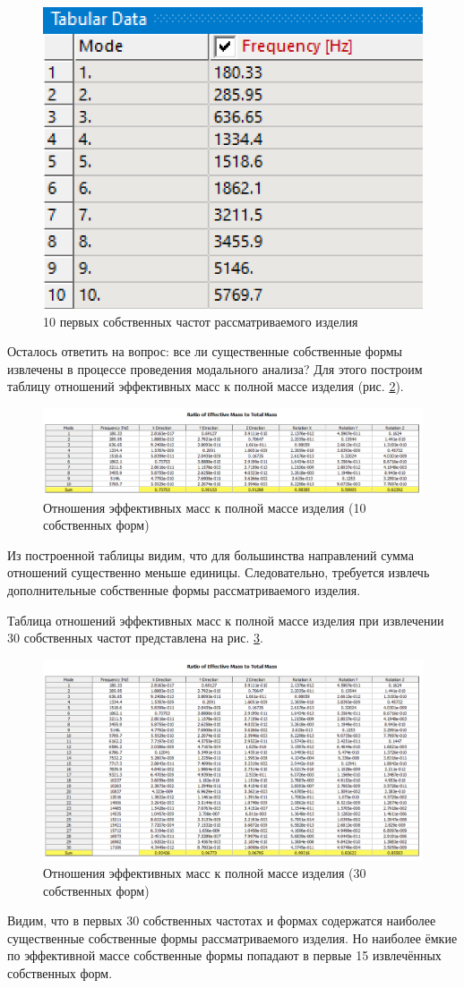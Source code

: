 \begin{figure}[H] 
	\center
	\includegraphics[width=.33\textwidth]{images/frequency_tabular.png}
	\caption{10 первых собственных частот рассматриваемого изделия}
	\label{fig:frequency_tabular}
\end{figure}

Осталось ответить на вопрос: все ли существенные собственные формы извлечены в процессе проведения модального анализа? Для этого построим таблицу отношений эффективных масс к полной массе изделия (рис. \ref{fig:ratio1}).

\begin{figure}[H] 
	\center
	\includegraphics[width=\textwidth]{images/ratio1.png}
	\caption{Отношения эффективных масс к полной массе изделия (10 собственных форм)}
	\label{fig:ratio1}
\end{figure}


Из построенной таблицы видим, что для большинства направлений сумма отношений существенно меньше единицы. Следовательно, требуется извлечь дополнительные собственные формы рассматриваемого изделия.

Таблица отношений эффективных масс к полной массе изделия при извлечении 30 собственных частот представлена на рис. \ref{fig:ratio2}.

\begin{figure}[H] 
	\center
	\includegraphics[width=\textwidth]{images/ratio2.png}
	\caption{Отношения эффективных масс к полной массе изделия (30 собственных форм)}
	\label{fig:ratio2}
\end{figure}

Видим, что в первых 30 собственных частотах и формах содержатся наиболее существенные собственные формы рассматриваемого изделия. Но наиболее ёмкие по эффективной массе собственные формы попадают в первые 15 извлечённых собственных форм.
